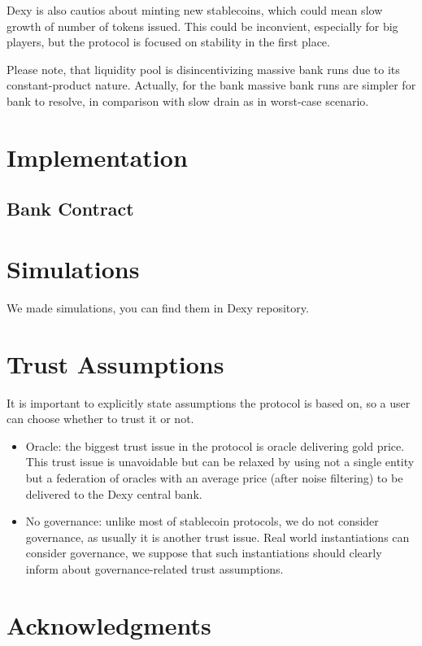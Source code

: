 \documentclass{article}   %
\newcommand{\authnote}[2]{\marginpar{\parbox{\marginparwidth}{\tiny %
  \textsf{#1 {\textcolor{blue}{notes: #2}}}}}%
  \textcolor{blue}{\textbf{\dag}}}
\newcommand{\authnote}[2]{
  \textsf{#1 \textcolor{blue}{: #2}}}
\newcommand{\authnote}[2]{}
\newcommand{\knote}[1]{{\authnote{\textcolor{green}{Alex notes}}{#1}}}
\newcommand{\sct}{stablecoin}
\newcommand{\dx}{Dexy}
\begin{document}
\dx{} is also cautios about minting new \sct{}s, which could mean slow growth of number of tokens issued. This could be inconvient, especially for big players, but the protocol is focused on stability in the first place. 

Please note, that liquidity pool is disincentivizing massive bank runs due to its constant-product nature. Actually, for the bank massive bank runs are simpler for bank to resolve, in comparison with slow drain as in worst-case scenario. 
 

\section{Implementation}

\subsection{Bank Contract}
\knote{put contracts here}

\section{Simulations}
We made simulations, you can find them in \dx{} repository. \knote{finish}

\section{Trust Assumptions}

It is important to explicitly state assumptions the protocol is based on, so a user can choose whether to trust it or not.

\begin{itemize}
  \item{Oracle: } the biggest trust issue in the protocol is oracle delivering gold price. This trust issue is unavoidable but can be relaxed by using not a single entity but a federation of oracles with an average price (after noise filtering) to be delivered to the Dexy central bank.
  \item{No governance: } unlike most of stablecoin protocols, we do not consider governance, as usually it is another trust issue. Real world instantiations can consider governance, we suppose that such instantiations should clearly inform about governance-related trust assumptions.
\end{itemize} 

\section*{Acknowledgments}
\end{document}
